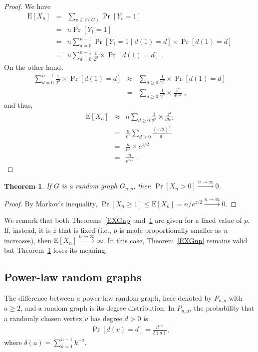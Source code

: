 \documentclass{article}
\newcommand{\st}{\;|\;}
\newcommand{\tendingtoinfty}[1]{\stackrel{#1 \rightarrow \infty}{\longrightarrow}}
\newtheorem{thm}[lem]{Theorem}
\begin{document}
\begin{proof}
We have 
\begin{eqnarray*}
	 \mathrm{E}[X_n] & = & \sum_{v \in V(G)} \Pr[Y_v = 1] \\
					& = & n \Pr[Y_1 = 1] \\
		  & = & n \sum_{d = 0}^{n - 1} \Pr[Y_1 = 1 \st d(1) = d] \times \Pr[d(1) = d] \\
		  & = & n \sum_{d = 0}^{n - 1} \frac{1}{2^d} \times \Pr[d(1) = d] \;{.}
\end{eqnarray*}
On the other hand,
\begin{eqnarray*}
	\sum_{d = 0}^{n - 1} \frac{1}{2^d} \times \Pr[d(1) = d] & \approx & \sum_{d \geq 0} \frac{1}{2^d} \times \Pr[d(1) = d] \\
    & = & \sum_{d \geq 0} \frac{1}{2^d} \times \frac{z^d}{d! e^z} \;{,}
\end{eqnarray*}
and thus,
\begin{eqnarray*}
	 \mathrm{E}[X_n] & \approx & n \sum_{d \geq 0} \frac{1}{2^d} \times \frac{z^d}{d! e^z} \\
					 & = & \frac{n}{e^z} \sum_{d \geq 0} \frac{(z/2)^d}{d!} \\
					 & = & \frac{n}{e^z} \times e^{z/2} \\
				     & = & \frac{n}{e^{z/2}} \;{.}
\end{eqnarray*} 
\end{proof}

\begin{thm}
\label{PXGnp}
If $G$ is a random graph $G_{n, p}$, then $\Pr[X_n > 0] \tendingtoinfty{n} 0$.
\end{thm}

\begin{proof}
By Markov's inequality,
$\Pr[X_n \geq 1] \leq \mathrm{E}[X_n] = n/e^{z/2} \tendingtoinfty{n} 0$.
\end{proof}

We remark that both Theorems~\ref{EXGnp} and~\ref{PXGnp} are given for a fixed
value of $p$. If, instead, it is $z$ that is fixed (i.e., $p$ is made
proportionally smaller as $n$ increases), then
$\mathrm{E}[X_n] \tendingtoinfty{n} \infty$. In this case, Theorem~\ref{EXGnp}
remains valid but Theorem~\ref{PXGnp} loses its meaning.

\subsection{Power-law random graphs}

The difference between a power-law random graph, here denoted by $P_{n,a}$ with
$a \geq 2$, and a random graph is its degree distribution. In $P_{n,a}$, the
probability that a randomly chosen vertex $v$ has degree $d > 0$ is
\begin{eqnarray*}
	 \Pr[d(v) = d] = \frac{d^{-a}}{\delta(a)}\mbox{,}
\end{eqnarray*}
where $\delta(a) = \sum_{k=1}^{n-1} k^{-a}$.
\end{document}
